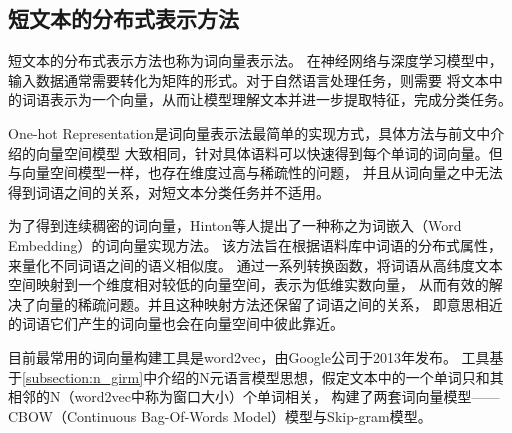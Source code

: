 \subsection{短文本的分布式表示方法}
短文本的分布式表示方法也称为词向量表示法。
在神经网络与深度学习模型中，输入数据通常需要转化为矩阵的形式。对于自然语言处理任务，则需要
将文本中的词语表示为一个向量，从而让模型理解文本并进一步提取特征，完成分类任务。

One-hot Representation是词向量表示法最简单的实现方式，具体方法与前文中介绍的向量空间模型
大致相同，针对具体语料可以快速得到每个单词的词向量。但与向量空间模型一样，也存在维度过高与稀疏性的问题，
并且从词向量之中无法得到词语之间的关系，对短文本分类任务并不适用。

为了得到连续稠密的词向量，Hinton等人提出了一种称之为词嵌入（Word Embedding）的词向量实现方法。
该方法旨在根据语料库中词语的分布式属性，来量化不同词语之间的语义相似度。
通过一系列转换函数，将词语从高纬度文本空间映射到一个维度相对较低的向量空间，表示为低维实数向量，
从而有效的解决了向量的稀疏问题。并且这种映射方法还保留了词语之间的关系，
即意思相近的词语它们产生的词向量也会在向量空间中彼此靠近。

目前最常用的词向量构建工具是word2vec，由Google公司于2013年发布。
工具基于\ref{subsection:n_girm}中介绍的N元语言模型思想，假定文本中的一个单词只和其相邻的N（word2vec中称为窗口大小）个单词相关，
构建了两套词向量模型——CBOW（Continuous Bag-Of-Words Model）模型与Skip-gram模型。

